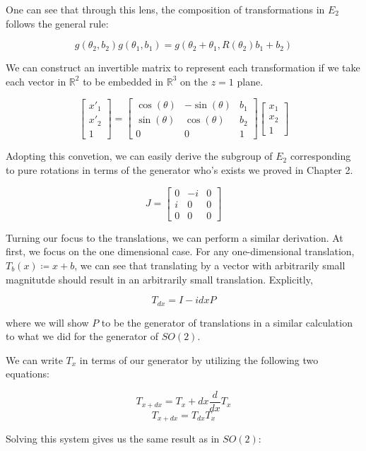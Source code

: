 \documentclass[10pt]{ucthesis}
\newcommand{\R}{\mathbb{R}}
\begin{document}
One can see that through this lens, the composition of transformations in $E_2$ follows the general rule:

$$g(\theta_2,b_2)g(\theta_1,b_1) = g(\theta_2+\theta_1,R(\theta_2)b_1 + b_2)$$

We can construct an invertible matrix to represent each transformation if we take each vector in $\R^2$ to be embedded in $\R^3$ on the $z=1$ plane.

$$\begin{bmatrix}x'_1\\x'_2 \\ 1\end{bmatrix} = \begin{bmatrix}
			\cos(\theta) & -\sin(\theta) & b_1\\
			\sin(\theta) & \cos(\theta) & b_2 \\
			0&0&1
		\end{bmatrix} \begin{bmatrix}x_1\\x_2\\1\end{bmatrix} $$

\noindent Adopting this convetion, we can easily derive the subgroup of $E_2$ corresponding to pure rotations in terms of the generator who's exists we proved in Chapter 2. 

$$J=\begin{bmatrix}
			0 & -i & 0\\
			i & 0 & 0 \\
			0 & 0 & 0
		\end{bmatrix}$$

Turning our focus to the translations, we can perform a similar derivation. At first, we focus on the one dimensional case. For any one-dimensional translation, $T_b(x)\coloneq x + b$,  we can see that translating by a vector with arbitrarily small magnitutde should result in an arbitrarily small translation. Explicitly,

$$T_{dx} = I -idxP$$

\noindent where we will show $P$ to be the generator of translations in a similar calculation to what we did for the generator of $SO(2)$.

We can write $T_x$ in terms of our generator by utilizing the following two equations:

$$T_{x+dx} = T_x + dx \frac{d}{dx}T_x$$
$$T_{x+dx} = T_{dx}T_x$$

Solving this system gives us the same result as in $SO(2)$:
\end{document}
